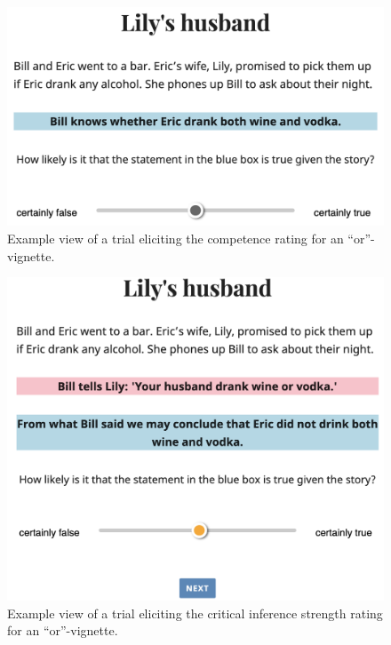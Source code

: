 \documentclass{sp}
\begin{document}
\begin{figure}[h]
 	\begin{center}
 		\includegraphics[width=0.8\linewidth]{images/screenshot_xor_comp.png}
 	\end{center}
 	\vspace{-0.3cm}
 	\caption{Example view of a trial eliciting the competence rating for an ``or''-vignette.}
 	\label{screenshot-xor-comp}
\end{figure}
\begin{figure}[h]
	\begin{center}
		\includegraphics[width=0.8\linewidth]{images/screenshot_xor_target.png}
	\end{center}
	\vspace{-0.3cm}
	\caption{Example view of a trial eliciting the critical inference strength rating for an ``or''-vignette.}
	\label{screenshot-xor-target}
\end{figure}
 
\end{document}
